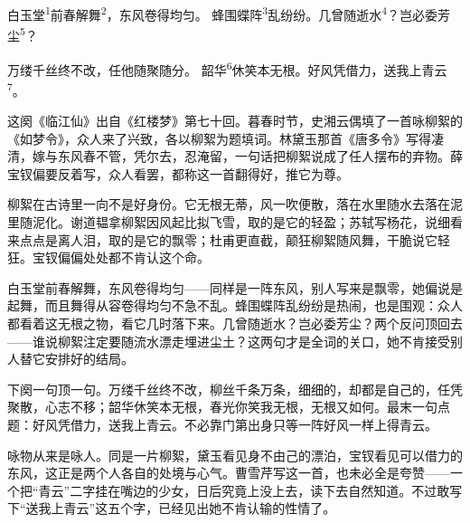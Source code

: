 
\begin{poem}
白玉堂\textsuperscript{1}前春解舞\textsuperscript{2}，东风卷得均匀。
蜂围蝶阵\textsuperscript{3}乱纷纷。几曾随逝水\textsuperscript{4}？岂必委芳尘\textsuperscript{5}？

万缕千丝终不改，任他随聚随分。
韶华\textsuperscript{6}休笑本无根。好风凭借力，送我上青云\textsuperscript{7}。
\end{poem}

\begin{annotations}
\end{annotations}

\begin{appreciation}
这阕《临江仙》出自《红楼梦》第七十回。暮春时节，史湘云偶填了一首咏柳絮的《如梦令》，众人来了兴致，各以柳絮为题填词。林黛玉那首《唐多令》写得凄清，嫁与东风春不管，凭尔去，忍淹留，一句话把柳絮说成了任人摆布的弃物。薛宝钗偏要反着写，众人看罢，都称这一首翻得好，推它为尊。

柳絮在古诗里一向不是好身份。它无根无蒂，风一吹便散，落在水里随水去落在泥里随泥化。谢道韫拿柳絮因风起比拟飞雪，取的是它的轻盈；苏轼写杨花，说细看来点点是离人泪，取的是它的飘零；杜甫更直截，颠狂柳絮随风舞，干脆说它轻狂。宝钗偏偏处处都不肯认这个命。

白玉堂前春解舞，东风卷得均匀——同样是一阵东风，别人写来是飘零，她偏说是起舞，而且舞得从容卷得均匀不急不乱。蜂围蝶阵乱纷纷是热闹，也是围观：众人都看着这无根之物，看它几时落下来。几曾随逝水？岂必委芳尘？两个反问顶回去——谁说柳絮注定要随流水漂走埋进尘土？这两句才是全词的关口，她不肯接受别人替它安排好的结局。

下阕一句顶一句。万缕千丝终不改，柳丝千条万条，细细的，却都是自己的，任凭聚散，心志不移；韶华休笑本无根，春光你笑我无根，无根又如何。最末一句点题：好风凭借力，送我上青云。不必靠门第出身只等一阵好风一样上得青云。

咏物从来是咏人。同是一片柳絮，黛玉看见身不由己的漂泊，宝钗看见可以借力的东风，这正是两个人各自的处境与心气。曹雪芹写这一首，也未必全是夸赞——一个把“青云”二字挂在嘴边的少女，日后究竟上没上去，读下去自然知道。不过敢写下“送我上青云”这五个字，已经见出她不肯认输的性情了。
\end{appreciation}
